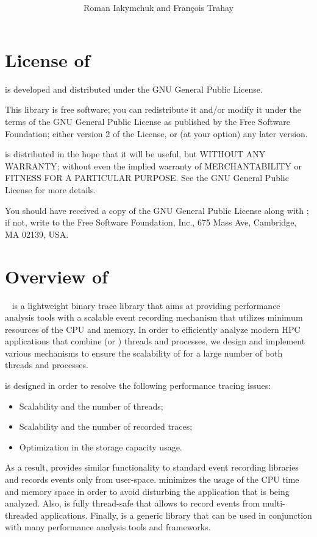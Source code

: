 

\title{
{\Huge\bf \reporttitle{}}\\[6mm]
{\LARGE\bf \reportsubtitle}\\[12mm]
{\Large\bf \reportsubsubtitle}}
\author{Roman Iakymchuk and Fran\c{c}ois Trahay}


\maketitle

\tableofcontents

\chapter{License of \litl}
\litl{} is developed and distributed under the GNU General Public License.

This library is free software; you can redistribute it and/or modify it under 
the terms of the GNU General Public License as published by the Free Software 
Foundation; either version 2 of the License, or (at your option) any later 
version.

\litl{} is distributed in the hope that it will be useful, but WITHOUT ANY 
WARRANTY; without even the implied warranty of MERCHANTABILITY or FITNESS FOR A 
PARTICULAR PURPOSE. See the GNU General Public License for more details.

You should have received a copy of the GNU General Public License along with 
\litl{}; if not, write to the Free Software Foundation, Inc., 675 Mass Ave, 
Cambridge, MA 02139, USA.


\chapter{Overview of \litl}
\litl{}~\cite{litl} is a lightweight binary trace library that aims at 
providing performance analysis tools with a scalable event recording mechanism 
that utilizes minimum resources of the CPU and memory. In order to efficiently 
analyze modern HPC applications that combine \openmp{} (or \pthread) threads 
and \mpi{} processes, we design and implement various mechanisms to ensure the 
scalability of \litl{} for a large  number of both threads and processes. 

\litl{} is designed in order to resolve the following performance tracing 
issues:
\begin{itemize}
 \item Scalability and the number of threads;
 \item Scalability and the number of recorded traces;
 \item Optimization in the storage capacity usage.
\end{itemize}
As a result, \litl{} provides similar functionality to standard event recording 
libraries and records events only from user-space. \litl{} minimizes the usage 
of the CPU time and memory space in order to avoid disturbing the application 
that is being analyzed. Also, \litl{} is fully thread-safe that allows to record 
events from multi-threaded applications. Finally, \litl{} is a generic library 
that can be used in conjunction with many performance analysis tools and 
frameworks. 


